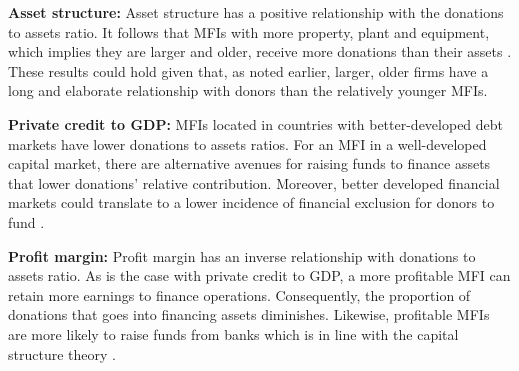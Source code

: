 \documentclass[a4paper,nobind]{templates/ociamthesis}
\begin{document}
\textbf{Asset structure:} Asset structure has a positive relationship with the donations to assets ratio. It follows that MFIs with more property, plant and equipment, which implies they are larger and older, receive more donations than their assets \autocite{cull2018microfinance}. These results could hold given that, as noted earlier, larger, older firms have a long and elaborate relationship with donors than the relatively younger MFIs.

\textbf{Private credit to GDP:} MFIs located in countries with better-developed debt markets have lower donations to assets ratios. For an MFI in a well-developed capital market, there are alternative avenues for raising funds to finance assets that lower donations' relative contribution. Moreover, better developed financial markets could translate to a lower incidence of financial exclusion for donors to fund \autocite{marron2013governing}.

\textbf{Profit margin:} Profit margin has an inverse relationship with donations to assets ratio. As is the case with private credit to GDP, a more profitable MFI can retain more earnings to finance operations. Consequently, the proportion of donations that goes into financing assets diminishes. Likewise, profitable MFIs are more likely to raise funds from banks which is in line with the capital structure theory \autocite{dorfleitner2017access}.
\end{document}
